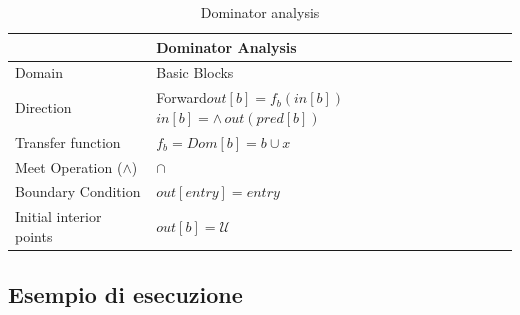 \documentclass[10pt,a4paper]{article}
\begin{document}
\begin{table}[h!]
  \centering
  \begin{tabular}{|l|p{4cm}|}
    \hline
    \textbf{} & \textbf{Dominator Analysis} \\
    \hline
    Domain & Basic Blocks\\
    \hline
    Direction & Forward\newline $out[b]=f_{b}(in[b])$\newline $in[b]=\wedge\, out(pred[b])$\\
    \hline
    Transfer function & $f_b = Dom[b] = b \cup x$\\
    \hline
    Meet Operation (\(\land\)) & $\cap$ \\
    \hline
    Boundary Condition & $out[entry] = entry $\\
    \hline
    Initial interior points & $out[b] = \mathcal{U} $ \\
    \hline
  \end{tabular}
  \caption{Dominator analysis}
\end{table}

\subsection{Esempio di esecuzione}
\end{document}
